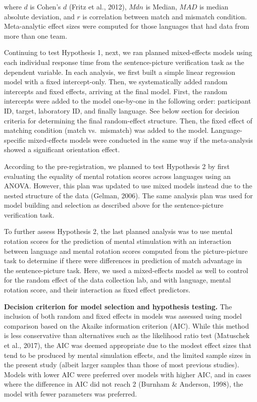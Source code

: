 \documentclass[
  man,floatsintext]{apa7}
\begin{document}
where \(d\) is Cohen's \(d\) (Fritz et al., 2012), \(Mdn\) is Median, \(MAD\) is median
absolute deviation, and \(r\) is correlation between match and mismatch
condition. Meta-analytic effect sizes were computed for those languages
that had data from more than one team.

Continuing to test Hypothesis 1, next, we ran planned mixed-effects
models using each individual response time from the sentence-picture
verification task as the dependent variable. In each analysis, we first
built a simple linear regression model with a fixed intercept-only.
Then, we systematically added random intercepts and fixed effects,
arriving at the final model. First, the random intercepts were added to
the model one-by-one in the following order: participant ID, target,
laboratory ID, and finally language. See below section for decision criteria for determining the final random-effect structure. Then, the
fixed effect of matching condition (match vs.~mismatch) was added to the
model. Language-specific mixed-effects models were conducted in the same
way if the meta-analysis showed a significant orientation effect.

According to the pre-registration, we planned to test Hypothesis 2 by
first evaluating the equality of mental rotation scores across languages
using an ANOVA. However, this plan was updated to use mixed models
instead due to the nested structure of the data (Gelman, 2006). The same
analysis plan was used for model building and selection as described
above for the sentence-picture verification task.

To further assess Hypothesis 2, the last planned analysis was to use
mental rotation scores for the prediction of mental stimulation with an
interaction between language and mental rotation scores computed from
the picture-picture task to determine if there were differences in
prediction of match advantage in the sentence-picture task. Here, we
used a mixed-effects model as well to control for the random effect of
the data collection lab, and with language, mental rotation score, and
their interaction as fixed effect predictors.

\textbf{Decision criterion for model selection and hypothesis testing.} The
inclusion of both random and fixed effects in models was assessed using
model comparison based on the Akaike information criterion (AIC). While
this method is less conservative than alternatives such as the
likelihood ratio test (Matuschek et al., 2017), the AIC was deemed appropriate
due to the modest effect sizes that tend to be produced by mental
simulation effects, and the limited sample sizes in the present study
(albeit larger samples than those of most previous studies). Models with
lower AIC were preferred over models with higher AIC, and in cases where
the difference in AIC did not reach 2 (Burnham \& Anderson, 1998), the model with
fewer parameters was preferred.
\end{document}
